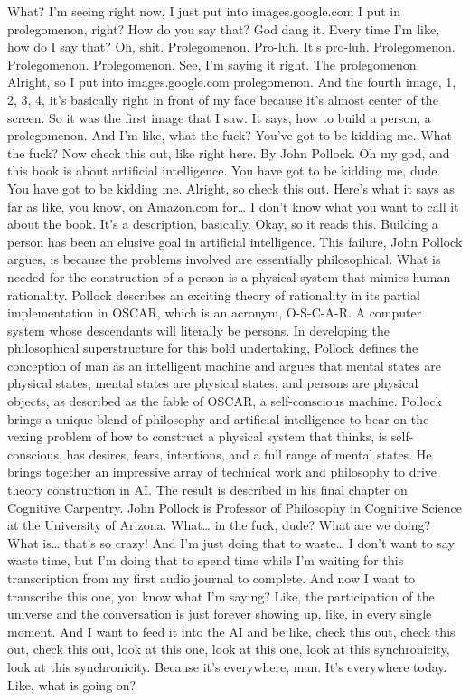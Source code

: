 \documentclass{article}
\begin{document}
What? I'm seeing right now, I just put into images.google.com I put in
prolegomenon, right? How do you say that? God dang it. Every time I'm
like, how do I say that? Oh, shit. Prolegomenon. Pro-luh. It's pro-luh.
Prolegomenon. Prolegomenon. Prolegomenon. See, I'm saying it right. The
prolegomenon. Alright, so I put into images.google.com prolegomenon. And
the fourth image, 1, 2, 3, 4, it's basically right in front of my face
because it's almost center of the screen. So it was the first image that
I saw. It says, how to build a person, a prolegomenon. And I'm like,
what the fuck? You've got to be kidding me. What the fuck? Now check
this out, like right here. By John Pollock. Oh my god, and this book is
about artificial intelligence. You have got to be kidding me, dude. You
have got to be kidding me. Alright, so check this out. Here's what it
says as far as like, you know, on Amazon.com for\ldots{} I don't know
what you want to call it about the book. It's a description, basically.
Okay, so it reads this. Building a person has been an elusive goal in
artificial intelligence. This failure, John Pollock argues, is because
the problems involved are essentially philosophical. What is needed for
the construction of a person is a physical system that mimics human
rationality. Pollock describes an exciting theory of rationality in its
partial implementation in OSCAR, which is an acronym, O-S-C-A-R. A
computer system whose descendants will literally be persons. In
developing the philosophical superstructure for this bold undertaking,
Pollock defines the conception of man as an intelligent machine and
argues that mental states are physical states, mental states are
physical states, and persons are physical objects, as described as the
fable of OSCAR, a self-conscious machine. Pollock brings a unique blend
of philosophy and artificial intelligence to bear on the vexing problem
of how to construct a physical system that thinks, is self-conscious,
has desires, fears, intentions, and a full range of mental states. He
brings together an impressive array of technical work and philosophy to
drive theory construction in AI. The result is described in his final
chapter on Cognitive Carpentry. John Pollock is Professor of Philosophy
in Cognitive Science at the University of Arizona. What\ldots{} in the
fuck, dude? What are we doing? What is\ldots{} that's so crazy! And I'm
just doing that to waste\ldots{} I don't want to say waste time, but I'm
doing that to spend time while I'm waiting for this transcription from
my first audio journal to complete. And now I want to transcribe this
one, you know what I'm saying? Like, the participation of the universe
and the conversation is just forever showing up, like, in every single
moment. And I want to feed it into the AI and be like, check this out,
check this out, check this out, look at this one, look at this one, look
at this synchronicity, look at this synchronicity. Because it's
everywhere, man. It's everywhere today. Like, what is going on?
\end{document}

